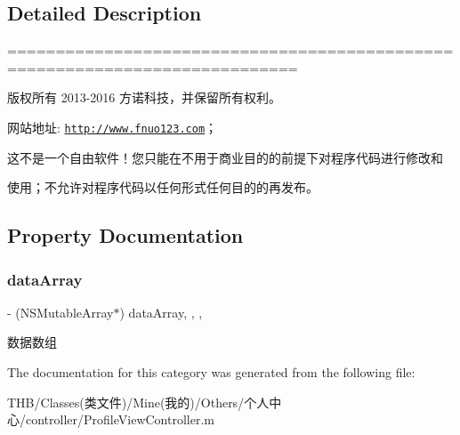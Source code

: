 \subsection{Detailed Description}
============================================================================

版权所有 2013-\/2016 方诺科技，并保留所有权利。

网站地址\+: \href{http://www.fnuo123.com}{\tt http\+://www.\+fnuo123.\+com}； 



这不是一个自由软件！您只能在不用于商业目的的前提下对程序代码进行修改和

使用；不允许对程序代码以任何形式任何目的的再发布。 

 

\subsection{Property Documentation}
\mbox{\label{category_profile_view_controller_07_08_a94bce918827c2d557748482fa1f8811d}} 
\subsubsection{\texorpdfstring{data\+Array}{dataArray}}
{\footnotesize\ttfamily -\/ (N\+S\+Mutable\+Array$\ast$) data\+Array\hspace{0.3cm}{\ttfamily [read]}, {\ttfamily [write]}, {\ttfamily [nonatomic]}, {\ttfamily [strong]}}

数据数组 

The documentation for this category was generated from the following file\+:\begin{DoxyCompactItemize}
\item 
T\+H\+B/\+Classes(类文件)/\+Mine(我的)/\+Others/个人中心/controller/Profile\+View\+Controller.\+m\end{DoxyCompactItemize}
